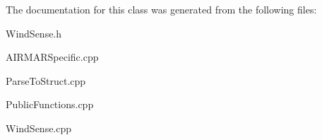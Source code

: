 \-The documentation for this class was generated from the following files\-:\begin{DoxyCompactItemize}
\item 
\-Wind\-Sense.\-h\item 
\-A\-I\-R\-M\-A\-R\-Specific.\-cpp\item 
\-Parse\-To\-Struct.\-cpp\item 
\-Public\-Functions.\-cpp\item 
\-Wind\-Sense.\-cpp\end{DoxyCompactItemize}
